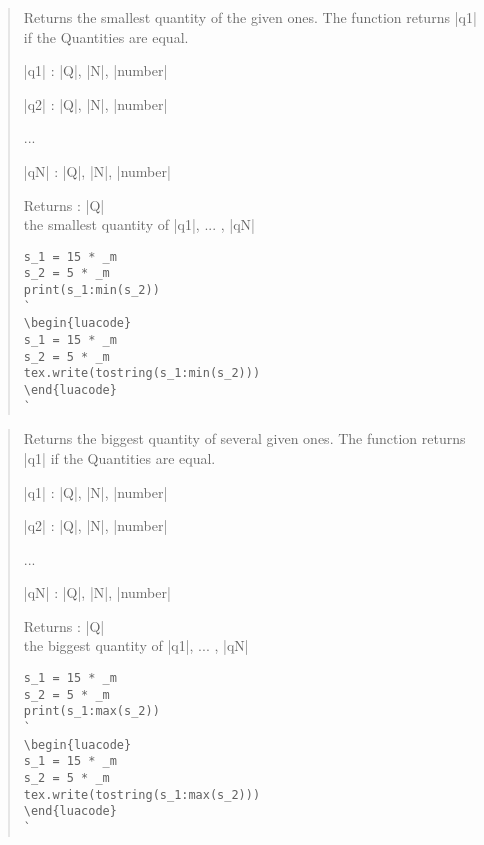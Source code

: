 \documentclass{ltxdoc}
\begin{document}
\begin{quote}
  Returns the smallest quantity of the given ones. The function returns |q1| if the Quantities are equal.

  \begin{description}
  \item |q1| : |Q|, |N|, |number|

  \item |q2| : |Q|, |N|, |number|

  \item ...

  \item |qN| : |Q|, |N|, |number|\\

  \item Returns : |Q|\\
    the smallest quantity of |q1|, ... , |qN|
  \end{description}


\begin{lstlisting}
s_1 = 15 * _m
s_2 = 5 * _m
print(s_1:min(s_2))
`
\begin{luacode}
s_1 = 15 * _m
s_2 = 5 * _m
tex.write(tostring(s_1:min(s_2)))
\end{luacode}
`
\end{lstlisting}
\end{quote}


\begin{quote}
  Returns the biggest quantity of several given ones. The function returns |q1| if the Quantities are equal.

  \begin{description}
  \item |q1| : |Q|, |N|, |number|

  \item |q2| : |Q|, |N|, |number|

  \item ...

  \item |qN| : |Q|, |N|, |number|\\

  \item Returns : |Q|\\
    the biggest quantity of |q1|, ... , |qN|
  \end{description}


\begin{lstlisting}
s_1 = 15 * _m
s_2 = 5 * _m
print(s_1:max(s_2))
`
\begin{luacode}
s_1 = 15 * _m
s_2 = 5 * _m
tex.write(tostring(s_1:max(s_2)))
\end{luacode}
`
\end{lstlisting}
\end{quote}
\end{document}
